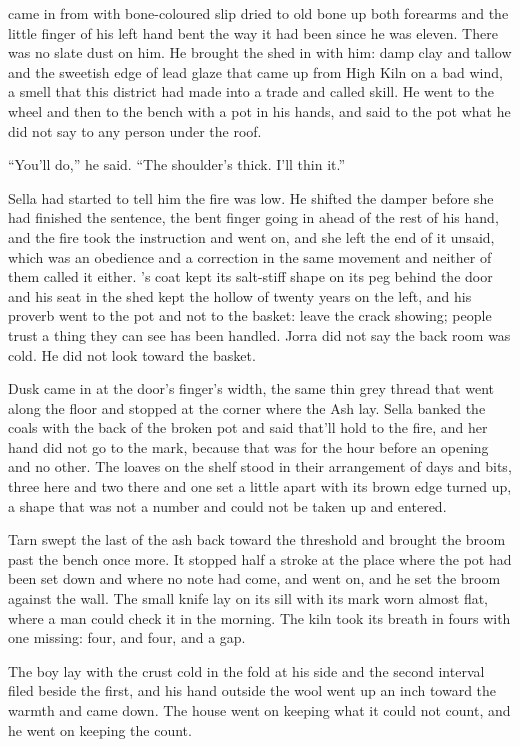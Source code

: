  came in from  with bone-coloured slip dried to old bone up both forearms and the little finger of his left hand bent the way it had been since he was eleven. There was no slate dust on him. He brought the shed in with him: damp clay and tallow and the sweetish edge of lead glaze that came up from High Kiln on a bad wind, a smell that this district had made into a trade and called skill. He went to the wheel and then to the bench with a pot in his hands, and said to the pot what he did not say to any person under the roof.

“You'll do,” he said. “The shoulder's thick. I'll thin it.”

Sella had started to tell him the fire was low. He shifted the damper before she had finished the sentence, the bent finger going in ahead of the rest of his hand, and the fire took the instruction and went on, and she left the end of it unsaid, which was an obedience and a correction in the same movement and neither of them called it either. 's coat kept its salt-stiff shape on its peg behind the door and his seat in the shed kept the hollow of twenty years on the left, and his proverb went to the pot and not to the basket: leave the crack showing; people trust a thing they can see has been handled. Jorra did not say the back room was cold. He did not look toward the basket.

Dusk came in at the door's finger's width, the same thin grey thread that went along the floor and stopped at the corner where the Ash lay. Sella banked the coals with the back of the broken pot and said that'll hold to the fire, and her hand did not go to the mark, because that was for the hour before an opening and no other. The loaves on the shelf stood in their arrangement of days and bits, three here and two there and one set a little apart with its brown edge turned up, a shape that was not a number and could not be taken up and entered.

Tarn swept the last of the ash back toward the threshold and brought the broom past the bench once more. It stopped half a stroke at the place where the pot had been set down and where no note had come, and went on, and he set the broom against the wall. The small knife lay on its sill with its mark worn almost flat, where a man could check it in the morning. The kiln took its breath in fours with one missing: four, and four, and a gap.

The boy lay with the crust cold in the fold at his side and the second interval filed beside the first, and his hand outside the wool went up an inch toward the warmth and came down. The house went on keeping what it could not count, and he went on keeping the count.

